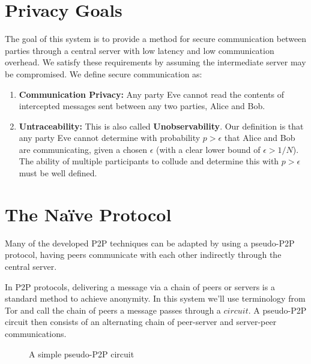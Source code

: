 \documentclass[twocolumn,11pt,english]{article}
\begin{document}
\section{Privacy Goals}
The goal of this system is to provide a method for secure communication between parties through a central server with low latency and low communication overhead. We satisfy these requirements by assuming the intermediate server may be compromised. We define secure communication as:
\begin{enumerate}
\item\textbf{Communication Privacy:} Any party Eve cannot read the contents of intercepted messages sent between any two parties, Alice and Bob. 
\item\textbf{Untraceability:} This is also called \textbf{Unobservability}. Our definition is that any party Eve cannot determine with probability $p > \epsilon$ that Alice and Bob are communicating, given a chosen $\epsilon$ (with a clear lower bound of $\epsilon > 1/N$). The ability of multiple participants to collude and determine this with $p > \epsilon$ must be well defined.
\end{enumerate}
\section{The Na\"ive Protocol}
Many of the developed P2P techniques can be adapted by using a pseudo-P2P protocol, having peers communicate with each other indirectly through the central server. 

In P2P protocols, delivering a message via a chain of peers or servers is a standard method to achieve anonymity. In this system we'll use terminology from Tor\cite{tor-design} and call the chain of peers a message passes through a $circuit$. A pseudo-P2P circuit then consists of an alternating chain of peer-server and server-peer communications.

\begin{figure}[ht]
  \begin{center}
  \end{center}
  \caption{A simple pseudo-P2P circuit}
\end{figure}
\end{document}
